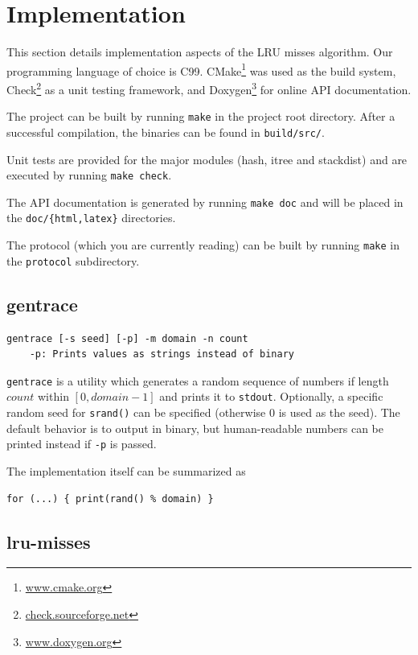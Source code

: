 \documentclass[a4paper,10pt]{article}
\begin{document}
\section{Implementation}

This section details implementation aspects of the LRU misses algorithm.
Our programming language of choice is C99. CMake\footnote{\url{www.cmake.org}} was used as the build system, Check\footnote{\url{check.sourceforge.net}} as a unit testing framework, and Doxygen\footnote{\url{www.doxygen.org}} for online API documentation.

The project can be built by running \verb|make| in the project root directory. After a successful compilation, the binaries can be found in \verb|build/src/|.

Unit tests are provided for the major modules (hash, itree and stackdist) and are executed by running \verb|make check|.

The API documentation is generated by running \verb|make doc| and will be
placed in the \verb|doc/{html,latex}| directories.

The protocol (which you are currently reading) can be built by running
\verb|make| in the \verb|protocol| subdirectory.

\subsection{gentrace}

\begin{verbatim}
gentrace [-s seed] [-p] -m domain -n count
    -p: Prints values as strings instead of binary
\end{verbatim}

\verb|gentrace| is a utility which generates a random sequence of numbers
if length $count$ within $[0, domain - 1]$ and prints it to \lstinline|stdout|. Optionally, a specific
random seed for \lstinline|srand()| can be specified (otherwise $0$ is
used as the seed). The default behavior is to output in binary, but
human-readable numbers can be printed instead if \verb|-p| is passed.

The implementation itself can be summarized as

\begin{lstlisting}
for (...) { print(rand() % domain) }
\end{lstlisting}

\subsection{lru-misses}
\end{document}
